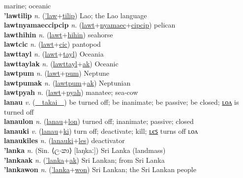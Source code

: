 marine; oceanic \label{lawtak} \\
\textbf{'lawtilip} \textit{n.} (\hyperref['law]{'law}+\hyperref[tilip]{tilip})
Lao; the Lao language \label{'lawtilip} \\
\textbf{lawtnyamaeccipcip} \textit{n.} (\hyperref[lawt]{lawt}+\hyperref[nyamaec]{nyamaec}+\hyperref[cipcip]{cipcip})
pelican \label{lawtnyamaeccipcip} \\
\textbf{lawthihin} \textit{n.} (\hyperref[lawt]{lawt}+\hyperref[hihin]{hihin})
seahorse \label{lawthihin} \\
\textbf{lawtcic} \textit{n.} (\hyperref[lawt]{lawt}+\hyperref[cic]{cic})
pantopod \label{lawtcic} \\
\textbf{lawttayl} \textit{n.} (\hyperref[lawt]{lawt}+\hyperref[tayl]{tayl})
Oceania \label{lawttayl} \\
\textbf{lawttaylak} \textit{n.} (\hyperref[lawttayl]{lawttayl}+\hyperref[ak]{ak})
Oceanic \label{lawttaylak} \\
\textbf{lawtpum} \textit{n.} (\hyperref[lawt]{lawt}+\hyperref[pum]{pum})
Neptune \label{lawtpum} \\
\textbf{lawtpumak} \textit{n.} (\hyperref[lawtpum]{lawtpum}+\hyperref[ak]{ak})
Neptunian \label{lawtpumak} \\
\textbf{lawtpyah} \textit{n.} (\hyperref[lawt]{lawt}+\hyperref[pyah]{pyah})
manatee; sea-cow \label{lawtpyah} \\
\textbf{lanau} \textit{v.} (\hyperref[takai]{~~takai~~})
be turned off; be inanimate; be passive; be closed; \hyperref[lanaulon]{ʟᴏᴧ} is turned off \label{lanau} \\
\textbf{lanaulon} \textit{n.} (\hyperref[lanau]{lanau}+\hyperref[lon]{lon})
turned off; inanimate; passive; closed \label{lanaulon} \\
\textbf{lanauki} \textit{v.} (\hyperref[lanau]{lanau}+\hyperref[ki]{ki})
turn off; deactivate; kill; \hyperref[lanaukiles]{ʟєꜱ} turns off ʟᴏᴧ \label{lanauki} \\
\textbf{lanaukiles} \textit{n.} (\hyperref[lanauki]{lanauki}+\hyperref[les]{les})
deactivator \label{lanaukiles} \\
\textbf{'lanka} \textit{n.} (Sin. ⟨ලංකා⟩ [laŋkaː])
Sri Lanka (landmass) \label{'lanka} \\
\textbf{'lankaak} \textit{n.} (\hyperref['lanka]{'lanka}+\hyperref[ak]{ak})
Sri Lankan; from Sri Lanka \label{'lankaak} \\
\textbf{'lankawon} \textit{n.} (\hyperref['lanka]{'lanka}+\hyperref[won]{won})
Sri Lankan; the Sri Lankan people \label{'lankawon} \\
